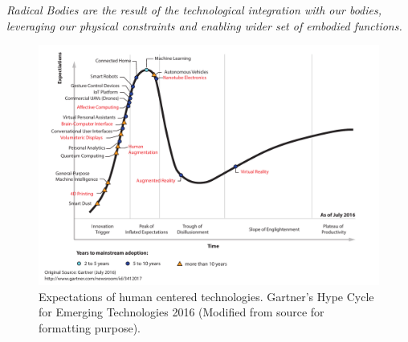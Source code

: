 \begin{shaded}
\footnotesize
\centering
\textit{Radical Bodies are the result of the technological integration with our bodies, leveraging our physical constraints and enabling wider set of embodied functions.} 

\end{shaded}

\begin{figure}[t!]
  \centering
  \includegraphics[width=0.9\linewidth]{figures/intro/gartner_hypecycle2016.pdf}
  \captionsetup{justification=centering}
  \caption[Gartner's Hype Cycle for Emerging Technologies 2016]{Expectations of human centered technologies. Gartner's Hype Cycle for Emerging Technologies 2016 (Modified from source for formatting purpose).}
  \label{fig:intro-hype}
\end{figure}

